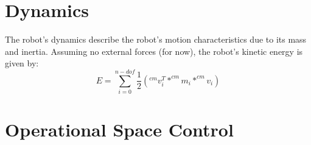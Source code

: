 \documentclass[12pt]{article}
\begin{document}
\section{Dynamics}
The robot's dynamics describe the robot's motion characteristics due to its mass and inertia. 
Assuming no external forces (for now), the robot's kinetic energy is given by:
\begin{equation}
  E = \sum_{i=0}^{n-dof} \frac{1}{2} (^{cm}v_i^T * ^{cm} m_i * ^{cm} v_i)
\end{equation}


\section{Operational Space Control}
\end{document}
